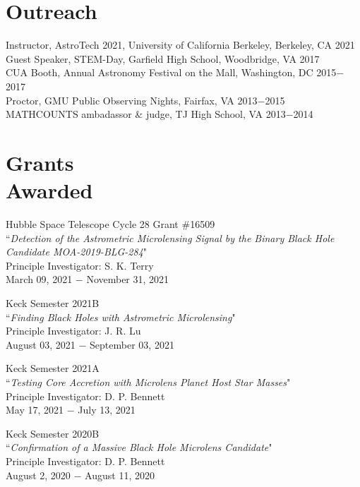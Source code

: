 \documentclass[margin,line]{cv}
\begin{document}
\begin{resume}
\section{\sc Outreach}
Instructor, AstroTech 2021, University of California Berkeley, Berkeley, CA \hfill 2021 \\
Guest Speaker, STEM-Day, Garfield High School, Woodbridge, VA \hfill 2017 \\
CUA Booth, Annual Astronomy Festival on the Mall, Washington, DC \hfill 2015$-$2017 \\
Proctor, GMU Public Observing Nights, Fairfax, VA \hfill 2013$-$2015 \\
MATHCOUNTS ambadassor \& judge, TJ High School, VA \hfill 2013$-$2014 \\

\section{\sc Grants \\ Awarded}
Hubble Space Telescope Cycle 28 Grant \#16509 \\
``\textit{Detection of the Astrometric Microlensing Signal by the Binary Black Hole Candidate MOA-2019-BLG-284}" \\
Principle Investigator: S. K. Terry \\
March 09, 2021 $-$ November 31, 2021

Keck Semester 2021B \\
``\textit{Finding Black Holes with Astrometric Microlensing}" \\
Principle Investigator: J. R. Lu\\
August 03, 2021 $-$ September 03, 2021

Keck Semester 2021A \\
``\textit{Testing Core Accretion with Microlens Planet Host Star Masses}" \\
Principle Investigator: D. P. Bennett\\
May 17, 2021 $-$ July 13, 2021

Keck Semester 2020B \\
``\textit{Confirmation of a Massive Black Hole Microlens Candidate}" \\
Principle Investigator: D. P. Bennett\\
August 2, 2020 $-$ August 11, 2020


\end{resume}
\end{document}
